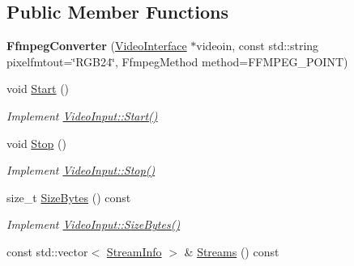 \subsection*{Public Member Functions}
\begin{DoxyCompactItemize}
\item 
{\bfseries Ffmpeg\+Converter} (\hyperlink{structpangolin_1_1_video_interface}{Video\+Interface} $\ast$videoin, const std\+::string pixelfmtout=\char`\"{}R\+G\+B24\char`\"{}, Ffmpeg\+Method method=F\+F\+M\+P\+E\+G\+\_\+\+P\+O\+I\+NT)\hypertarget{classpangolin_1_1_ffmpeg_converter_a69b5561ab5a5a8e8cab92f1ecdd13212}{}\label{classpangolin_1_1_ffmpeg_converter_a69b5561ab5a5a8e8cab92f1ecdd13212}

\item 
void \hyperlink{classpangolin_1_1_ffmpeg_converter_a25e3030bf21b559196b14c27aa1e53e3}{Start} ()\hypertarget{classpangolin_1_1_ffmpeg_converter_a25e3030bf21b559196b14c27aa1e53e3}{}\label{classpangolin_1_1_ffmpeg_converter_a25e3030bf21b559196b14c27aa1e53e3}

\begin{DoxyCompactList}\small\item\em Implement \hyperlink{structpangolin_1_1_video_input_a74a2e3e1b87c7cbf9de9bcb39e1df128}{Video\+Input\+::\+Start()} \end{DoxyCompactList}\item 
void \hyperlink{classpangolin_1_1_ffmpeg_converter_a8e3a0216a517525c104bfc753050a463}{Stop} ()\hypertarget{classpangolin_1_1_ffmpeg_converter_a8e3a0216a517525c104bfc753050a463}{}\label{classpangolin_1_1_ffmpeg_converter_a8e3a0216a517525c104bfc753050a463}

\begin{DoxyCompactList}\small\item\em Implement \hyperlink{structpangolin_1_1_video_input_a8945f80194cc7ec9594db7f27e7d09b8}{Video\+Input\+::\+Stop()} \end{DoxyCompactList}\item 
size\+\_\+t \hyperlink{classpangolin_1_1_ffmpeg_converter_a6f251afa8078734cf1d8ee334746c8f7}{Size\+Bytes} () const \hypertarget{classpangolin_1_1_ffmpeg_converter_a6f251afa8078734cf1d8ee334746c8f7}{}\label{classpangolin_1_1_ffmpeg_converter_a6f251afa8078734cf1d8ee334746c8f7}

\begin{DoxyCompactList}\small\item\em Implement \hyperlink{structpangolin_1_1_video_input_a93cee5c33386973a2a51165e6bdcf40b}{Video\+Input\+::\+Size\+Bytes()} \end{DoxyCompactList}\item 
const std\+::vector$<$ \hyperlink{classpangolin_1_1_stream_info}{Stream\+Info} $>$ \& \hyperlink{classpangolin_1_1_ffmpeg_converter_a52ba3ad0dac71cba146b87257c8d546c}{Streams} () const \hypertarget{classpangolin_1_1_ffmpeg_converter_a52ba3ad0dac71cba146b87257c8d546c}{}\label{classpangolin_1_1_ffmpeg_converter_a52ba3ad0dac71cba146b87257c8d546c}


\end{DoxyCompactItemize}
